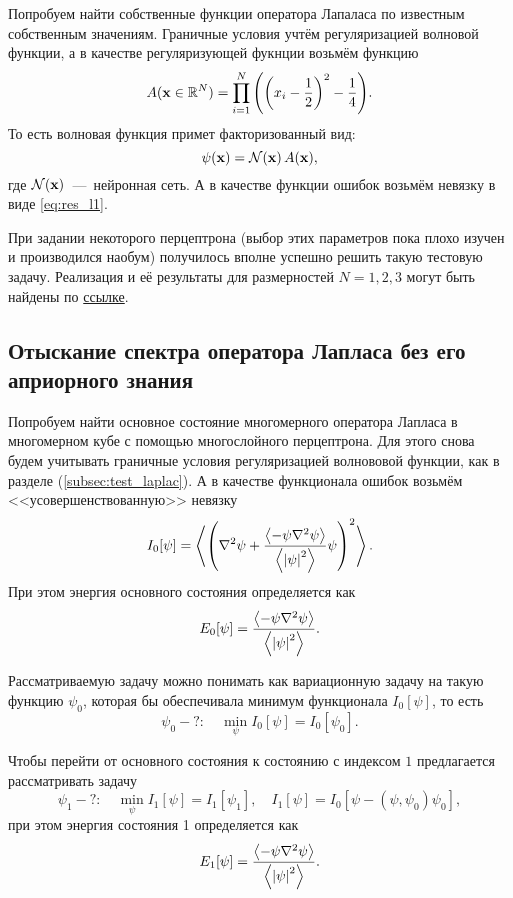 \documentclass[11pt]{article}
\numberwithin{equation}{section}
\begin{document}
Попробуем найти собственные функции оператора Лапаласа по известным собственным значениям. Граничные условия учтём регуляризацией волновой функции, а в качестве регуляризующей фукнции возьмём функцию
\begin{equation}
 A(\vb{x}\in\mathbb{R}^N) = \prod_{i=1}^{N} \qty(\qty(x_i - \dfrac{1}{2})^2 - \dfrac{1}{4}).
\end{equation}
То есть волновая функция примет факторизованный вид:
\begin{equation}
 \psi(\vb{x}) = \mathcal{N}(\vb{x}) \, A(\vb{x}),
\end{equation}
где $\mathcal{N}(\vb{x})$~---~нейронная сеть. А в качестве функции ошибок возьмём невязку в виде \eqref{eq:res_l1}.

При задании некоторого перцептрона (выбор этих параметров пока плохо изучен и производился наобум) получилось вполне успешно решить такую тестовую задачу. Реализация и её результаты для размерностей $N=1,2,3$ могут быть найдены по \href{https://github.com/MrKozelberg/wavefunction_perceptron/blob/spectrum_laplace_operator/spectrum_laplace_operator_1.ipynb}{ссылке}.

\subsection{Отыскание спектра оператора Лапласа без его априорного знания}

Попробуем найти основное состояние многомерного оператора Лапласа в многомерном кубе с помощью многослойного перцептрона. Для этого снова будем учитывать граничные условия регуляризацией волнововой функции, как в разделе (\ref{subsec:test_laplac}). А в качестве функционала ошибок возьмём <<усовершенствованную>> невязку
\begin{equation}
	I_0[\psi] = \expval{ \qty(\laplacian \psi + \dfrac{\expval{-\psi\laplacian \psi}}{\expval{\abs{\psi}^2}} \psi)^2}.
\end{equation}
При этом энергия основного состояния определяется как
\begin{equation}
 E_0 [\psi] = \dfrac{\expval{-\psi\laplacian \psi}}{\expval{\abs{\psi}^2}}.
\end{equation}

Рассматриваемую задачу можно понимать как вариационную задачу на такую функцию $\psi_0$, которая бы обеспечивала минимум функционала $I_0[\psi]$, то есть
\begin{equation}
 \psi_0-?:\quad \min_{\psi} I_0[\psi] = I_0[\psi_0].
\end{equation}

Чтобы перейти от основного состояния к состоянию с индексом $1$ предлагается рассматривать задачу
\begin{equation}
 \psi_1-?:\quad \min_{\psi} I_1[\psi] = I_1[\psi_1],\quad I_1[\psi] = I_0[\psi-(\psi,\psi_0)\psi_0],
\end{equation}
при этом энергия состояния 1 определяется как
\begin{equation}
 E_1 [\psi] = \dfrac{\expval{-\psi\laplacian \psi}}{\expval{\abs{\psi}^2}}.
\end{equation}
\end{document}
